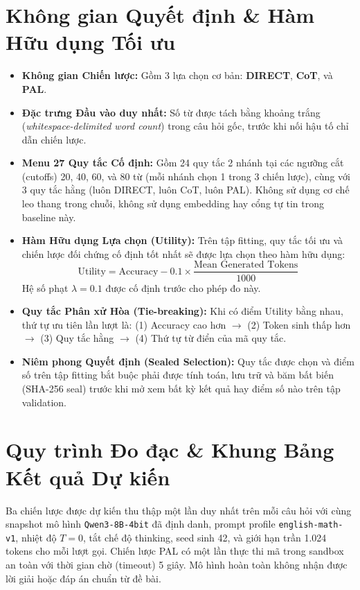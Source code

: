 \documentclass[11pt,a4paper]{report}
\begin{document}
\section{Không gian Quyết định \& Hàm Hữu dụng Tối ưu}

\begin{itemize}[leftmargin=*]
    \item \textbf{Không gian Chiến lược:} Gồm 3 lựa chọn cơ bản: \textbf{DIRECT}, \textbf{CoT}, và \textbf{PAL}.
    \item \textbf{Đặc trưng Đầu vào duy nhất:} Số từ được tách bằng khoảng trắng (\textit{whitespace-delimited word count}) trong câu hỏi gốc, trước khi nối hậu tố chỉ dẫn chiến lược.
    \item \textbf{Menu 27 Quy tắc Cố định:} Gồm 24 quy tắc 2 nhánh tại các ngưỡng cắt (cutoffs) 20, 40, 60, và 80 từ (mỗi nhánh chọn 1 trong 3 chiến lược), cùng với 3 quy tắc hằng (luôn DIRECT, luôn CoT, luôn PAL). Không sử dụng cơ chế leo thang trong chuỗi, không sử dụng embedding hay cổng tự tin trong baseline này.
    \item \textbf{Hàm Hữu dụng Lựa chọn (Utility):} Trên tập fitting, quy tắc tối ưu và chiến lược đối chứng cố định tốt nhất sẽ được lựa chọn theo hàm hữu dụng:
    $$\text{Utility} = \text{Accuracy} - 0.1 \times \frac{\text{Mean Generated Tokens}}{1000}$$
    Hệ số phạt $\lambda = 0.1$ được cố định trước cho phép đo này.
    \item \textbf{Quy tắc Phân xử Hòa (Tie-breaking):} Khi có điểm Utility bằng nhau, thứ tự ưu tiên lần lượt là: (1) Accuracy cao hơn $\to$ (2) Token sinh thấp hơn $\to$ (3) Quy tắc hằng $\to$ (4) Thứ tự từ điển của mã quy tắc.
    \item \textbf{Niêm phong Quyết định (Sealed Selection):} Quy tắc được chọn và điểm số trên tập fitting bắt buộc phải được tính toán, lưu trữ và băm bất biến (SHA-256 seal) trước khi mở xem bất kỳ kết quả hay điểm số nào trên tập validation.
\end{itemize}

\section{Quy trình Đo đạc \& Khung Bảng Kết quả Dự kiến}

Ba chiến lược được dự kiến thu thập một lần duy nhất trên mỗi câu hỏi với cùng snapshot mô hình \texttt{Qwen3-8B-4bit} đã định danh, prompt profile \texttt{english-math-v1}, nhiệt độ $T=0$, tắt chế độ thinking, seed sinh 42, và giới hạn trần 1.024 tokens cho mỗi lượt gọi. Chiến lược PAL có một lần thực thi mã trong sandbox an toàn với thời gian chờ (timeout) 5 giây. Mô hình hoàn toàn không nhận được lời giải hoặc đáp án chuẩn từ đề bài.
\end{document}
